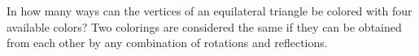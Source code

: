 In how many ways can the vertices of an equilateral triangle be colored with four available colors? Two colorings are considered the same if they can be obtained from each other by any combination of rotations and reflections.
